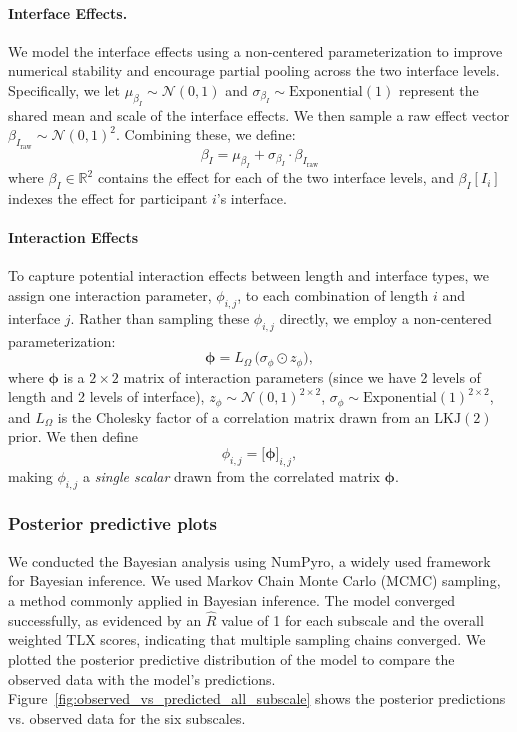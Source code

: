 \paragraph{Interface Effects.}
We model the interface effects using a non-centered parameterization to improve numerical stability and encourage partial pooling across the two interface levels. Specifically, we let $\mu_{\beta_I} \sim \mathcal{N}(0,1)$ and $\sigma_{\beta_I} \sim \mathrm{Exponential}(1)$ represent the shared mean and scale of the interface effects. We then sample a raw effect vector $\beta_{I_{\text{raw}}} \sim \mathcal{N}(0,1)^2.$ Combining these, we define:
\begin{equation}
    \beta_I = \mu_{\beta_I} + \sigma_{\beta_I} \cdot \beta_{I_{\text{raw}}}
    \label{eq:interface_reparam}
\end{equation}
where $\beta_I \in \mathbb{R}^2$ contains the effect for each of the two interface levels, 
and $\beta_I[I_i]$ indexes the effect for participant $i$'s interface. 

\paragraph{Interaction Effects} To capture potential interaction effects between length and interface types, we assign one interaction parameter, $\phi_{i,j}$, to each combination of length $i$ and interface $j$. Rather than sampling these $\phi_{i,j}$ directly, we employ a non-centered parameterization:
\[
  \boldsymbol{\phi} = L_{\Omega} \,\bigl(\sigma_{\phi} \odot z_{\phi}\bigr),
\]
where \(\boldsymbol{\phi}\) is a $2 \times 2$ matrix of interaction parameters (since we have 2 levels of length and 2 levels of interface), $z_{\phi} \sim \mathcal{N}(0,1)^{2\times2}$, $\sigma_{\phi} \sim \text{Exponential}(1)^{2\times2}$, and $L_{\Omega}$ is the Cholesky factor of a correlation matrix drawn from an $\text{LKJ}(2)$ prior. We then define
\[
    \phi_{i,j} 
    = 
    \bigl[\boldsymbol{\phi}\bigr]_{i,j},
\]
making $\phi_{i,j}$ a \emph{single scalar} drawn from the correlated matrix $\boldsymbol{\phi}$.

\subsubsection{Posterior predictive plots}
We conducted the Bayesian analysis using NumPyro, a widely used framework for Bayesian inference. We used Markov Chain Monte Carlo (MCMC) sampling, a method commonly applied in Bayesian inference. The model converged successfully, as evidenced by an $\hat{R}$ value of 1 for each subscale and the overall weighted TLX scores, indicating that multiple sampling chains converged. We plotted the posterior predictive distribution of the model to compare the observed data with the model's predictions. Figure~\ref{fig:observed_vs_predicted_all_subscale} shows the posterior predictions vs. observed data for the six subscales.

